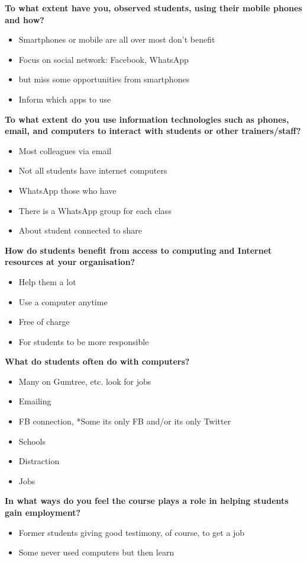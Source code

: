 \noindent\textbf{To what extent have you, observed students, using their mobile phones and how?}
\begin{itemize}
\item Smartphones or mobile are all over most don’t benefit
\item Focus on social network: Facebook, WhatsApp
\item but miss some opportunities from smartphones
\item Inform which apps to use
\end{itemize}

\noindent\textbf{To what extent do you use information technologies such as phones, email, and computers to interact with students or other trainers/staff?}
\begin{itemize}
\item Most colleagues via email
\item Not all students have internet computers
\item WhatsApp those who have
\item There is a WhatsApp group for each class
\item About student connected to share
\end{itemize}

\noindent\textbf{How do students benefit from access to computing and Internet resources at your organisation?}
\begin{itemize}
\item Help them a lot
\item Use a computer anytime
\item Free of charge
\item For students to be more responsible
\end{itemize}

\noindent\textbf{What do students often do with computers?}
\begin{itemize}
\item Many on Gumtree, etc. look for jobs
\item Emailing
\item FB connection, *Some its only FB and/or its only Twitter
\item Schools
\item Distraction
\item Jobs
\end{itemize}



\noindent\textbf{In what ways do you feel the course plays a role in helping students gain employment?}
\begin{itemize}
\item Former students giving good testimony, of course, to get a job
\item Some never used computers but then learn
\end{itemize}

